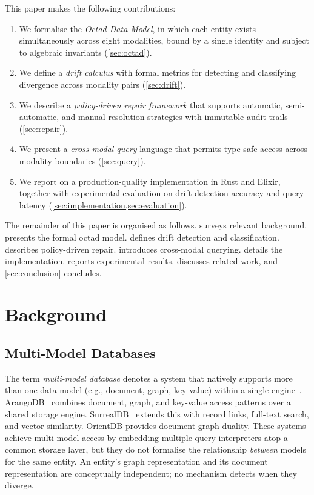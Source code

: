 \documentclass[11pt,twocolumn]{article}
\begin{document}
This paper makes the following contributions:

\begin{enumerate}[leftmargin=*]
  \item We formalise the \emph{Octad Data Model}, in which each entity exists
    simultaneously across eight modalities, bound by a single identity and
    subject to algebraic invariants (\cref{sec:octad}).
  \item We define a \emph{drift calculus} with formal metrics for detecting
    and classifying divergence across modality pairs (\cref{sec:drift}).
  \item We describe a \emph{policy-driven repair framework} that supports
    automatic, semi-automatic, and manual resolution strategies with immutable
    audit trails (\cref{sec:repair}).
  \item We present a \emph{cross-modal query} language that permits type-safe
    access across modality boundaries (\cref{sec:query}).
  \item We report on a production-quality implementation in Rust and Elixir,
    together with experimental evaluation on drift detection accuracy and
    query latency (\cref{sec:implementation,sec:evaluation}).
\end{enumerate}

The remainder of this paper is organised as follows.  
surveys relevant background.   presents the formal octad model.
 defines drift detection and classification.  
describes policy-driven repair.   introduces cross-modal
querying.   details the implementation.
 reports experimental results.   discusses
related work, and \cref{sec:conclusion} concludes.

\section{Background}\label{sec:background}

\subsection{Multi-Model Databases}

The term \emph{multi-model database} denotes a system that natively supports
more than one data model (e.g., document, graph, key-value) within a single
engine~\cite{lu2019multimodel}.  ArangoDB~\cite{arangodb2023} combines
document, graph, and key-value access patterns over a shared storage engine.
SurrealDB~\cite{surrealdb2024} extends this with record links, full-text
search, and vector similarity.  OrientDB provides document-graph duality.
These systems achieve multi-model access by embedding multiple query
interpreters atop a common storage layer, but they do not formalise the
relationship \emph{between} models for the same entity.  An entity's graph
representation and its document representation are conceptually independent;
no mechanism detects when they diverge.
\end{document}
